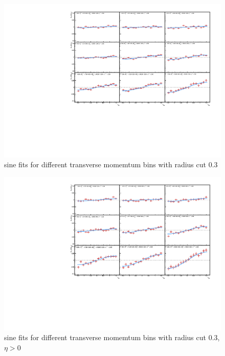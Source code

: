 \documentclass[letterpaper, abstract = on,listof=totoc, bibliography=totoc]{scrreprt}
\begin{document}
\begin{appendices}
\begin{figure}
\begin{center}
\includegraphics[width = 1\textwidth]{cone3Vpt_fullEtaV2.pdf}
\caption[sine fits for different transverse momemtum bins with radius cut 0.3]{sine fits for different transverse momemtum bins with radius cut 0.3}
\label{}
\end{center}
\end{figure}

\begin{figure}
\begin{center}
\includegraphics[width = 1\textwidth]{cone3Vpt_hiEtaV2.pdf}
\caption[sine fits for different transverse momemtum bins with radius cut 0.3]{sine fits for different transverse momemtum bins with radius cut 0.3, $\eta > 0$}
\label{}
\end{center}
\end{figure}



\end{appendices}
\end{document}
